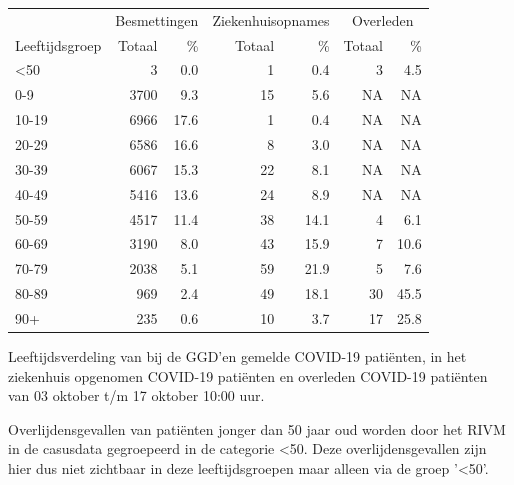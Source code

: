 \documentclass[
  english,
  man,floatsintext]{apa6}
\begin{document}
\begin{table}
\centering\begingroup\fontsize{11}{13}\selectfont

\begin{threeparttable}
\begin{tabular}{lrrrrrr}
\toprule
\multicolumn{1}{c}{ } & \multicolumn{2}{c}{Besmettingen} & \multicolumn{2}{c}{Ziekenhuisopnames} & \multicolumn{2}{c}{Overleden} \\
\cmidrule(l{3pt}r{3pt}){2-3} \cmidrule(l{3pt}r{3pt}){4-5} \cmidrule(l{3pt}r{3pt}){6-7}
Leeftijdsgroep & Totaal & \% & Totaal & \% & Totaal & \%\\
\midrule
<50 & 3 & 0.0 & 1 & 0.4 & 3 & 4.5\\
0-9 & 3700 & 9.3 & 15 & 5.6 & NA & NA\\
10-19 & 6966 & 17.6 & 1 & 0.4 & NA & NA\\
20-29 & 6586 & 16.6 & 8 & 3.0 & NA & NA\\
30-39 & 6067 & 15.3 & 22 & 8.1 & NA & NA\\
40-49 & 5416 & 13.6 & 24 & 8.9 & NA & NA\\
50-59 & 4517 & 11.4 & 38 & 14.1 & 4 & 6.1\\
60-69 & 3190 & 8.0 & 43 & 15.9 & 7 & 10.6\\
70-79 & 2038 & 5.1 & 59 & 21.9 & 5 & 7.6\\
80-89 & 969 & 2.4 & 49 & 18.1 & 30 & 45.5\\
90+ & 235 & 0.6 & 10 & 3.7 & 17 & 25.8\\
\bottomrule
\end{tabular}
\begin{tablenotes}
\item[1] Leeftijdsverdeling van bij de GGD’en gemelde COVID-19 patiënten, in het ziekenhuis opgenomen COVID-19 patiënten en overleden COVID-19 patiënten van 03 oktober t/m 17 oktober 10:00 uur.
\item[2] Overlijdensgevallen van patiënten jonger dan 50 jaar oud worden door het RIVM in de casusdata gegroepeerd in de categorie <50. Deze overlijdensgevallen zijn hier dus niet zichtbaar in deze leeftijdsgroepen maar alleen via de groep '<50'.
\end{tablenotes}
\end{threeparttable}
\endgroup{}
\end{table}

\newpage
\end{document}
